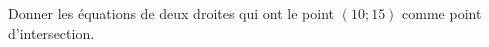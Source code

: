 
\begin{exercice}\label{exosmath-0451}

Donner les équations de deux droites qui ont le point \( (10;15)\) comme point d'intersection.

\end{exercice}
